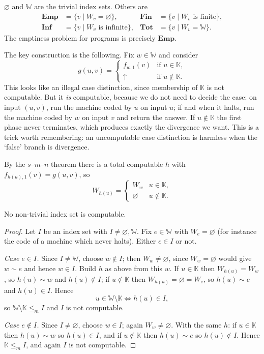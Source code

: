 \documentclass[a4paper]{scrartcl}
\newcommand{\WW}{\mathbb{W}}
\newcommand{\KK}{\mathbb{K}}
\newcommand{\Emp}{\mathbf{Emp}}
\newcommand{\Tot}{\mathbf{Tot}}
\newcommand{\Inf}{\mathbf{Inf}}
\newcommand{\Fine}{\mathbf{Fin}}
\begin{document}
\begin{example}
	$\varnothing$ and $\WW$ are the trivial index sets. Others are
	\begin{align*}
		\Emp &= \{v \mid W_v = \varnothing\}, & \Fine &= \{v \mid W_v \text{ is finite}\}, \\
		\Inf &= \{v \mid W_v \text{ is infinite}\}, & \Tot &= \{v \mid W_v = \WW\}.
	\end{align*}
	The emptiness problem for programs is precisely $\Emp$.
\end{example}

The key construction is the following. Fix $w \in \WW$ and consider
$$g(u,v) = \begin{cases} f_{w,1}(v) & \text{if } u \in \KK, \\ \uparrow & \text{if } u \notin \KK.\end{cases}$$
This looks like an illegal case distinction, since membership of $\KK$ is not computable. But it \emph{is} computable, because we do not need to decide the case: on input $(u,v)$, run the machine coded by $u$ on input $u$; if and when it halts, run the machine coded by $w$ on input $v$ and return the answer. If $u \notin\KK$ the first phase never terminates, which produces exactly the divergence we want. This is a trick worth remembering: an uncomputable case distinction is harmless when the `false' branch is divergence.

By the $s$--$m$--$n$ theorem there is a total computable $h$ with $f_{h(u),1}(v) = g(u,v)$, so
$$W_{h(u)} = \begin{cases} W_w & u \in \KK, \\ \varnothing & u \notin \KK.\end{cases}$$

\begin{theorem}[Rice]\label{thm:rice}
	No non-trivial index set is computable.
\end{theorem}

\begin{proof}
	Let $I$ be an index set with $I \neq\varnothing,\WW$. Fix $e \in \WW$ with $W_e = \varnothing$ (for instance the code of a machine which never halts). Either $e \in I$ or not.

	\emph{Case $e \in I$.} Since $I \neq \WW$, choose $w \notin I$; then $W_w \neq \varnothing$, since $W_w = \varnothing$ would give $w \sim e$ and hence $w \in I$. Build $h$ as above from this $w$. If $u \in \KK$ then $W_{h(u)} = W_w$, so $h(u)\sim w$ and $h(u)\notin I$; if $u \notin\KK$ then $W_{h(u)} = \varnothing = W_e$, so $h(u)\sim e$ and $h(u)\in I$. Hence
	$$u \in \WW\setminus\KK \iff h(u) \in I,$$
	so $\WW\setminus\KK \leq_m I$ and $I$ is not computable.

	\emph{Case $e \notin I$.} Since $I \neq\varnothing$, choose $w \in I$; again $W_w \neq\varnothing$. With the same $h$: if $u \in \KK$ then $h(u)\sim w$ so $h(u)\in I$, and if $u\notin\KK$ then $h(u)\sim e$ so $h(u)\notin I$. Hence $\KK \leq_m I$, and again $I$ is not computable.
\end{proof}
\end{document}
